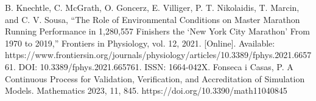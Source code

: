 \documentclass[conference]{IEEEtran}
\begin{document}
\begin{thebibliography}{00}
 B. Knechtle, C. McGrath, O. Goncerz, E. Villiger, P. T. Nikolaidis, T. Marcin, and C. V. Sousa, ``The Role of Environmental Conditions on Master Marathon Running Performance in 1,280,557 Finishers the ‘New York City Marathon’ From 1970 to 2019,'' Frontiers in Physiology, vol. 12, 2021. [Online]. Available: https://www.frontiersin.org/journals/physiology/articles/10.3389/fphys.2021.665761. DOI: 10.3389/fphys.2021.665761. ISSN: 1664-042X.
 Fonseca i Casas, P. A Continuous Process for Validation, Verification, and Accreditation of Simulation Models. Mathematics 2023, 11, 845. https://doi.org/10.3390/math11040845

\end{thebibliography}
\vspace{12pt}
\end{document}
